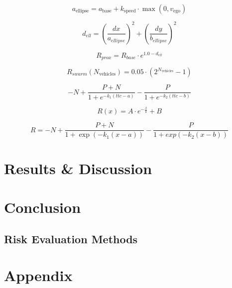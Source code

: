\documentclass[12pt, a4paper]{report}
\begin{document}
\begin{equation}
    a_{\mathrm{ellipse}} = a_{\mathrm{base}} + k_{\mathrm{speed}} \cdot \max(0, v_{\mathrm{ego}})
\end{equation}


\begin{equation}
    d_{ell} = \left(\frac{dx}{a_{ellipse}}\right)^2 + \left(\frac{dy}{b_{ellipse}}\right)^2
\end{equation}


\begin{equation}
    R_{prox} = R_{base} \cdot e^{1.0 - d_{ell}}
\end{equation}

\begin{equation}
    R_{swarm}(N_{\mathrm{vehicles}}) = 0.05 \cdot (2^{N_{\mathrm{vehicles}}} - 1)
\end{equation}



\begin{equation}
    -N + \frac{P + N}{1 + e^{-k_1 (ttc - a)}} - \frac{P}{1 + e^{-k_2 (ttc - b)}}
\end{equation}

\begin{equation}
    R(x) = A \cdot e^{-\frac{x}{k}} + B
\end{equation}





\begin{equation}
R = -N + \frac{P+N}{1+\exp(-k_1(x-a))} - \frac{P}{1+exp(-k_2(x-b))}
\end{equation}
\subsubsection{}
\section{Results \& Discussion}
\section{Conclusion}


\subsection{Risk Evaluation Methods}


\section{Appendix}
\end{document}
